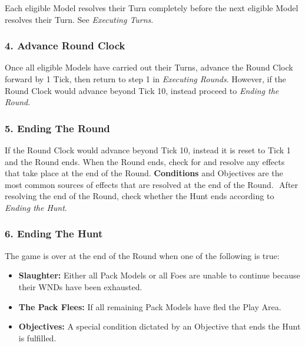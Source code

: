 \documentclass[
]{book}
\providecommand{\tightlist}{%
  \setlength{\itemsep}{0pt}\setlength{\parskip}{0pt}}
\begin{document}
Each eligible Model resolves their Turn completely before the next eligible Model resolves their Turn. See \emph{Executing Turns}.

\hypertarget{advance-round-clock}{%
\subsubsection*{4. Advance Round Clock}\label{advance-round-clock}}

Once all eligible Models have carried out their Turns, advance the Round Clock forward by 1 Tick, then return to step 1 in \emph{Executing Rounds}. However, if the Round Clock would advance beyond Tick 10, instead proceed to \emph{Ending the Round}.

\hypertarget{ending-the-round-1}{%
\subsubsection*{5. Ending The Round}\label{ending-the-round-1}}

If the Round Clock would advance beyond Tick 10, instead it is reset to Tick 1 and the Round ends. When the Round ends, check for and resolve any effects that take place at the end of the Round. \textbf{Conditions} and Objectives are the most common sources of effects that are resolved at the end of the Round. 
After resolving the end of the Round, check whether the Hunt ends according to \emph{Ending the Hunt}.

\hypertarget{ending-the-hunt}{%
\subsubsection*{6. Ending The Hunt}\label{ending-the-hunt}}

The game is over at the end of the Round when one of the following is true:

\begin{itemize}
\tightlist
\item
  \textbf{Slaughter:} Either all Pack Models or all Foes are unable to continue because their WNDs have been exhausted. 
\item
  \textbf{The Pack Flees:} If all remaining Pack Models have fled the Play Area.
\item
  \textbf{Objectives:} A special condition dictated by an Objective that ends the Hunt is fulfilled.
\end{itemize}
\end{document}
